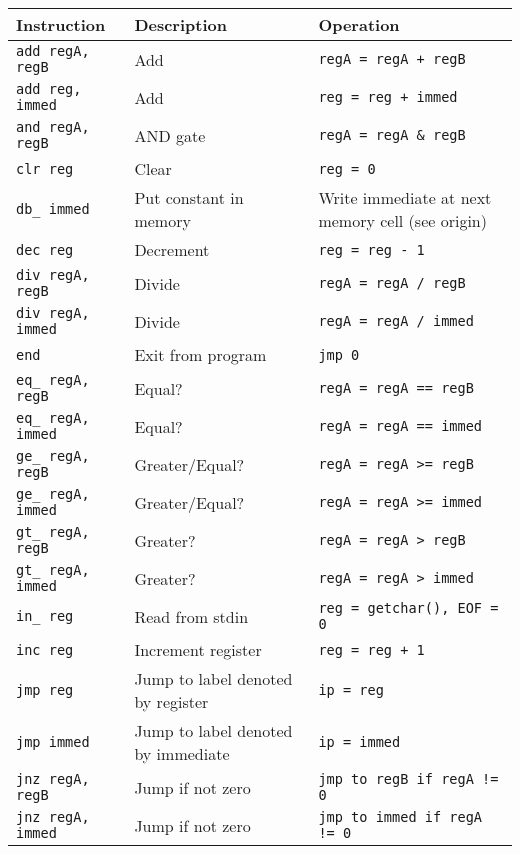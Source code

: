 \documentclass{article}
\begin{document}
\begin{table}[h]
\centering
\caption{Instructions}
\label{tab:instrs}
\begin{longtable}{lll}
\textbf{Instruction} & \textbf{Description} & \textbf{Operation} \\ \hline
\verb|add regA, regB| & Add & \verb|regA = regA + regB|      \\
\verb|add reg, immed| & Add & \verb|reg = reg + immed|      \\
\verb|and regA, regB| & AND gate & \verb|regA = regA & regB|     \\
\verb|clr reg| & Clear & \verb|reg = 0|     \\
\verb|db_ immed| & Put constant in memory  & Write immediate at next memory cell (see origin)     \\
\verb|dec reg| & Decrement & \verb|reg = reg - 1|     \\
\verb|div regA, regB| & Divide  & \verb|regA = regA / regB|    \\
\verb|div regA, immed| &  Divide & \verb|regA = regA / immed|    \\
\verb|end| & Exit from program & \verb|jmp 0|     \\
\verb|eq_ regA, regB| & Equal? & \verb|regA = regA == regB|     \\
\verb|eq_ regA, immed| & Equal? & \verb|regA = regA == immed|     \\
\verb|ge_ regA, regB| & Greater/Equal? & \verb|regA = regA >= regB|     \\
\verb|ge_ regA, immed| & Greater/Equal? & \verb|regA = regA >= immed|     \\
\verb|gt_ regA, regB| & Greater? & \verb|regA = regA > regB|     \\
\verb|gt_ regA, immed| & Greater? & \verb|regA = regA > immed|     \\
\verb|in_ reg| & Read from stdin & \verb|reg = getchar(), EOF = 0|     \\
\verb|inc reg| & Increment register & \verb|reg = reg + 1|     \\
\verb|jmp reg| & Jump to label denoted by register & \verb|ip = reg|     \\
\verb|jmp immed| & Jump to label denoted by immediate & \verb|ip = immed|      \\
\verb|jnz regA, regB| & Jump if not zero & \verb|jmp to regB if regA != 0|      \\
\verb|jnz regA, immed| & Jump if not zero & \verb|jmp to immed if regA != 0|      \\

\end{longtable}
\end{table}
\end{document}
